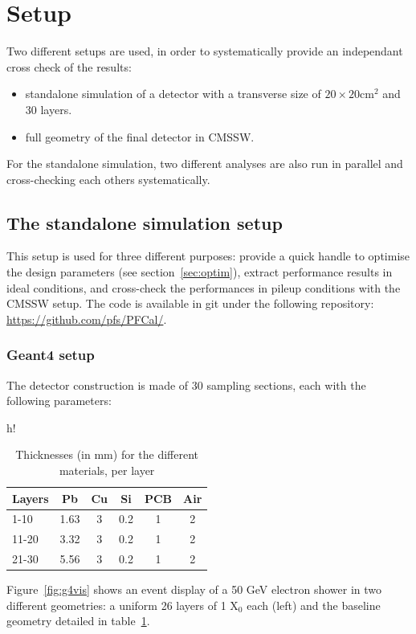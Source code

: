 \section{Setup}
\label{sec:setup}

Two different setups are used, in order to systematically provide an
independant cross check of the results:
\begin{itemize}
\item standalone simulation of a detector with a transverse size of $20 \times 20$cm$^2$ and 30 layers.
\item full geometry of the final detector in CMSSW.
\end{itemize}

For the standalone simulation, two different analyses are also run in
parallel and cross-checking each others systematically.

\subsection{The standalone simulation setup}
\label{sec:standalone}

This setup is used for three different purposes: provide a quick
handle to optimise the design parameters (see
section~\ref{sec:optim}), extract performance results in ideal
conditions, and cross-check the performances in pileup conditions with
the CMSSW setup. The code is available in git under the following
repository: \url{https://github.com/pfs/PFCal/}.

\subsubsection{Geant4 setup}

The detector construction is made of 30 sampling sections, each with
the following parameters:
\begin{table}{h!}
\caption{\label{tab:samplSec} Thicknesses (in mm) for the different materials, per layer}
\begin{tabular}{|l|c|c|c|c|c|}
\hline
Layers & Pb & Cu & Si & PCB & Air \\
\hline
1-10  & 1.63 & 3 & 0.2 & 1 & 2 \\
11-20 & 3.32 & 3 & 0.2 & 1 & 2 \\
21-30 & 5.56 & 3 & 0.2 & 1 & 2 \\
\hline
\end{tabular}
\end{table}

Figure~\ref{fig:g4vis} shows an event display of a 50 GeV electron
shower in two different geometries: a uniform 26 layers of 1 X$_0$
each (left) and the baseline geometry detailed in
table~\ref{tab:samplSec}.

